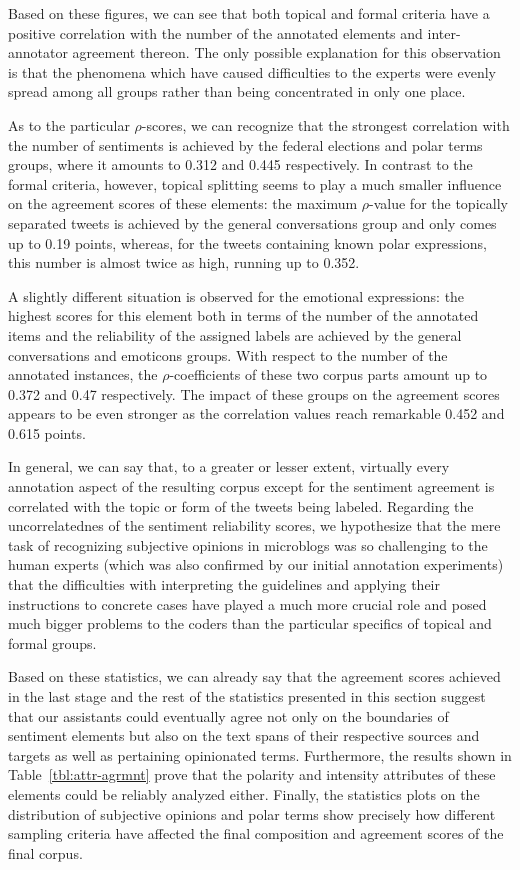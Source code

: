 Based on these figures, we can see that both topical and formal
criteria have a positive correlation with the number of the annotated
elements and inter-annotator agreement thereon.  The only possible
explanation for this observation is that the phenomena which have
caused difficulties to the experts were evenly spread among all groups
rather than being concentrated in only one place.

As to the particular $\rho$-scores, we can recognize that the
strongest correlation with the number of sentiments is achieved by the
federal elections and polar terms groups, where it amounts to 0.312
and 0.445 respectively.  In contrast to the formal criteria, however,
topical splitting seems to play a much smaller influence on the
agreement scores of these elements: the maximum $\rho$-value for the
topically separated tweets is achieved by the general conversations
group and only comes up to 0.19 points, whereas, for the tweets
containing known polar expressions, this number is almost twice as
high, running up to 0.352.

A slightly different situation is observed for the emotional
expressions: the highest scores for this element both in terms of the
number of the annotated items and the reliability of the assigned
labels are achieved by the general conversations and emoticons groups.
With respect to the number of the annotated instances, the
$\rho$-coefficients of these two corpus parts amount up to 0.372 and
0.47 respectively.  The impact of these groups on the agreement scores
appears to be even stronger as the correlation values reach remarkable
0.452 and 0.615 points.

In general, we can say that, to a greater or lesser extent, virtually
every annotation aspect of the resulting corpus except for the
sentiment agreement is correlated with the topic or form of the tweets
being labeled.  Regarding the uncorrelatednes of the sentiment
reliability scores, we hypothesize that the mere task of recognizing
subjective opinions in microblogs was so challenging to the human
experts (which was also confirmed by our initial annotation
experiments) that the difficulties with interpreting the guidelines
and applying their instructions to concrete cases have played a much
more crucial role and posed much bigger problems to the coders than
the particular specifics of topical and formal groups.

Based on these statistics, we can already say that the agreement
scores achieved in the last stage and the rest of the statistics
presented in this section suggest that our assistants could eventually
agree not only on the boundaries of sentiment elements but also on the
text spans of their respective sources and targets as well as
pertaining opinionated terms.  Furthermore, the results shown in
Table~\ref{tbl:attr-agrmnt} prove that the polarity and intensity
attributes of these elements could be reliably analyzed either.
Finally, the statistics plots on the distribution of subjective
opinions and polar terms show precisely how different
sampling criteria have affected the final composition and agreement
scores of the final corpus.

